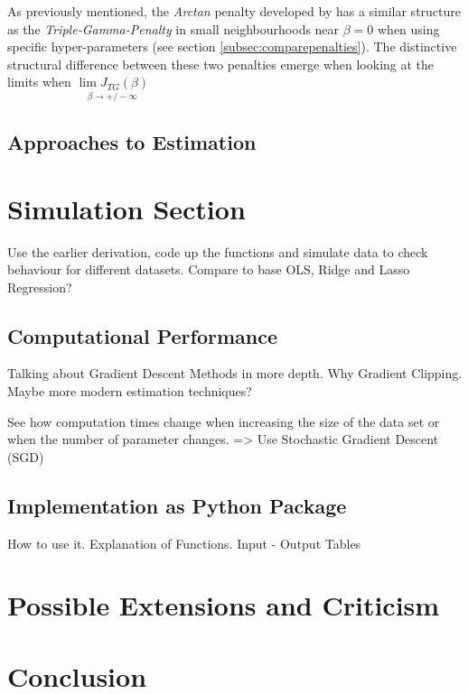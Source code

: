 \documentclass[12pt,a4paper]{article}
\begin{document}
As previously mentioned, the \textit{Arctan} penalty developed by \textcite{WangZhu2016} has a similar structure as the \textit{Triple-Gamma-Penalty} in small neighbourhoods near $\beta = 0$ when using specific hyper-parameters (see section \ref{subsec:comparepenalties}). The distinctive structural difference between these two penalties emerge when looking at the limits when  $\underset{\beta \to +/- \infty}{\lim J_{TG}(\beta)}$

\subsection{Approaches to Estimation}

\section{Simulation Section}
Use the earlier derivation, code up the functions and simulate data to check behaviour for different datasets. Compare to base OLS, Ridge and Lasso Regression?
\subsection{Computational Performance}
Talking about Gradient Descent Methods in more depth. Why Gradient Clipping. Maybe more modern estimation techniques? 

See how computation times change when increasing the size of the data set or when the number of parameter changes. => Use Stochastic Gradient Descent (SGD)
\subsection{Implementation as Python Package}

How to use it. 
Explanation of Functions. Input - Output Tables

\section{Possible Extensions and Criticism}
\section{Conclusion}
\end{document}
